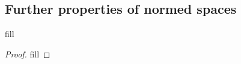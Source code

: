 \subsection{Further properties of normed spaces}

\begin{exercise}{1}
fill
\end{exercise}
\begin{proof}
fill
\end{proof}